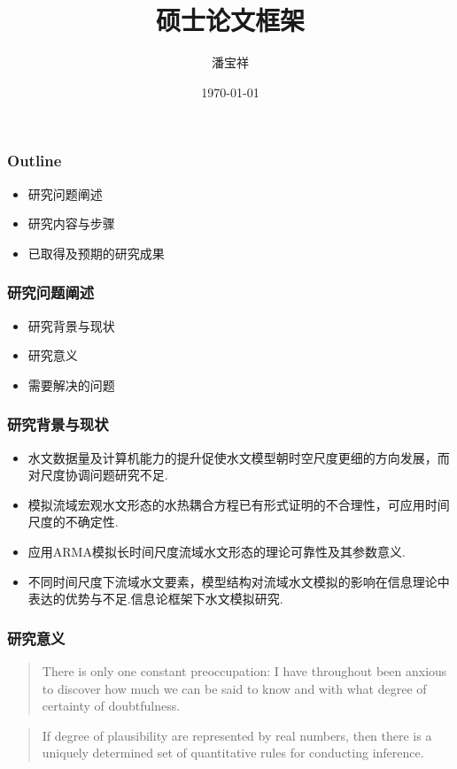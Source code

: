 \documentclass{beamer}
\begin{document}
\begin{CJK}{UTF8}{gkai}
\title{硕士论文框架}
\date{\today}
\author{潘宝祥}
\maketitle

\begin{frame}
\frametitle{Outline}
\begin{itemize}
\item 研究问题阐述
\item 研究内容与步骤
\item 已取得及预期的研究成果
\end{itemize}
\end{frame}



\begin{frame}
\frametitle{研究问题阐述}
\begin{itemize}
\item 研究背景与现状
\item 研究意义
\item 需要解决的问题
\end{itemize}
\end{frame}

\begin{frame}
\frametitle{研究背景与现状}
\begin{itemize}
\item 水文数据量及计算机能力的提升促使水文模型朝时空尺度更细的方向发展，而对尺度协调问题研究不足.
\item 模拟流域宏观水文形态的水热耦合方程已有形式证明的不合理性，可应用时间尺度的不确定性.
\item 应用ARMA模拟长时间尺度流域水文形态的理论可靠性及其参数意义.
\item 不同时间尺度下流域水文要素，模型结构对流域水文模拟的影响在信息理论中表达的优势与不足.信息论框架下水文模拟研究.
\end{itemize}
\end{frame}

\begin{frame}
\frametitle{研究意义}
\begin{quotation}
There is only one constant preoccupation: I have throughout been anxious to discover how much we can be said to know and with what degree of certainty of doubtfulness.
\end{quotation}
\begin{quotation}
If degree of plausibility are represented by real numbers, then there is a uniquely determined set of quantitative rules for conducting inference.
\end{quotation}
\end{frame}


\end{CJK}
\end{document}
